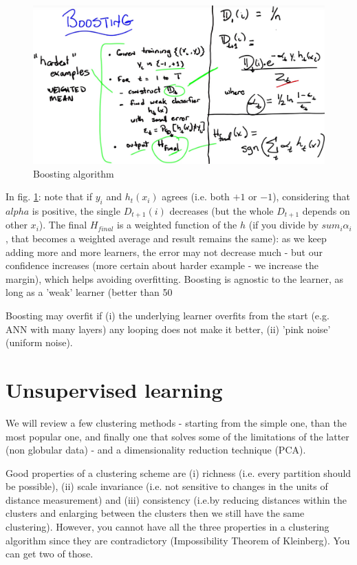 \documentclass[11pt]{article}
\begin{document}
\begin{figure}[htbp] 
	\centering
	\includegraphics[width=.9\textwidth]{pics/boosting_1}
	\caption{Boosting algorithm} 
	\label{boosting_1}
\end{figure}
In fig. \ref{boosting_1}: note that if $y_i$ and $h_t(x_i)$ agrees (i.e. both $+1$ or $-1$), considering that $alpha$ is positive, the single $D_{t+1}(i)$ decreases (but the whole $D_{t+1}$ depends on other $x_i$). The final $H_{final}$ is a weighted function of the $h$ (if you divide by $sum_i \alpha_i$, that becomes a weighted average and result remains the same): as we keep adding more and more learners, the error may not decrease much - but our confidence increases (more certain about harder example - we increase the margin), which helps avoiding overfitting. Boosting is agnostic to the learner, as long as a 'weak' learner (better than 50%

Boosting may overfit if (i) the underlying learner overfits from the start (e.g. ANN with many layers) any looping does not make it better, (ii) 'pink noise' (uniform noise). 

\section{Unsupervised learning}
We will review a few clustering methods - starting from the simple one, than the most popular one, and finally one that solves some of the limitations of the latter (non globular data) - and a dimensionality reduction technique (PCA).

Good properties of a clustering scheme are (i) richness (i.e. every partition should be possible), (ii) scale invariance (i.e. not sensitive to changes in the units of distance measurement) and (iii) consistency (i.e.by reducing distances within the clusters and enlarging between the clusters then we still have the same clustering).
However, you cannot have all the three properties in a clustering algorithm since they are contradictory (Impossibility Theorem of Kleinberg). You can get two of those.
\end{document}
